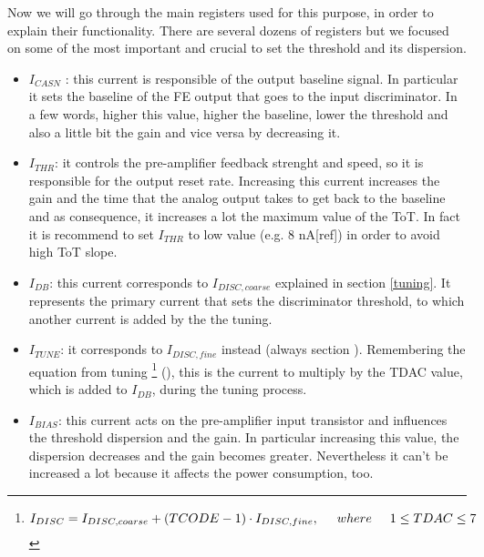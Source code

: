 Now we will go through the main registers used for this purpose, in order to explain their functionality. There are several dozens of registers but we focused on some of the most important and crucial to set the threshold and its dispersion.

\begin{itemize}
\label{currents}
\item \textit{$I_{CASN}$} : this current is responsible of the output baseline signal. In particular it sets the baseline of the FE output that goes to the input discriminator. In a few words, higher this value, higher the baseline, lower the threshold and also a little bit the gain and vice versa by decreasing it.
\item \textit{$I_{THR}$}: it controls the pre-amplifier feedback strenght and speed, so it is responsible for the output reset rate. Increasing this current increases the gain and the time that the analog output takes to get back to the baseline and as consequence, it increases a lot the maximum value of the ToT. In fact it is recommend to set $I_{THR}$ to low value (e.g. 8 nA[ref]) in order to avoid high ToT slope.
\item \textit{$I_{DB}$}: this current corresponds to \textbf{$I_{DISC,coarse}$} explained in section \vref{tuning}. It represents the primary current that sets the discriminator threshold, to which another current is added by the the tuning.
\item \textit{$I_{TUNE}$}: it corresponds to \textbf{$I_{DISC,fine}$} instead (always section ). Remembering the equation from tuning \footnote{
\begin{equation}
I_{DISC} = I_{DISC, coarse} + (TCODE - 1) \cdot I_{DISC,fine},  \hspace{.5cm}	where \hspace{.5cm} 1 \leq TDAC \leq 7
\end{equation}
} (), this is the current to multiply by the TDAC value, which is added to $I_{DB}$, during the tuning process.
\item \textit{$I_{BIAS}$}: this current acts on the pre-amplifier input transistor and influences the threshold dispersion and the gain. In particular increasing this value, the dispersion decreases and the gain becomes greater. Nevertheless it can't be increased a lot because it affects the power consumption, too. %
\end{itemize}


